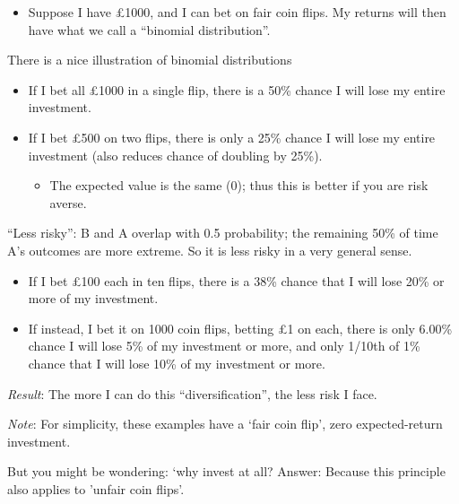 \documentclass[]{article}
\providecommand{\tightlist}{%
  \setlength{\itemsep}{0pt}\setlength{\parskip}{0pt}}
\begin{document}
\begin{itemize}
\tightlist
\item
  Suppose I have \pounds 1000, and I can bet on fair coin flips. My returns will then have what we call a ``binomial distribution''.
\end{itemize}

There is a nice illustration of binomial distributions

\begin{itemize}
\tightlist
\item
  If I bet all \pounds 1000 in a single flip, there is a 50\% chance I will lose my entire investment.
\item
  If I bet \pounds 500 on two flips, there is only a 25\% chance I will lose my entire investment (also reduces chance of doubling by 25\%).

  \begin{itemize}
  \tightlist
  \item
    The expected value is the same (0); thus this is better if you are risk averse.
  \end{itemize}
\end{itemize}

``Less risky'': B and A overlap with 0.5 probability; the remaining 50\% of time A's outcomes are more extreme. So it is less risky in a very general sense.

\begin{itemize}
\tightlist
\item
  If I bet \pounds 100 each in ten flips, there is a 38\% chance that I will lose 20\% or more of my investment.
\item
  If instead, I bet it on 1000 coin flips, betting \pounds 1 on each, there is only 6.00\% chance I will lose 5\% of my investment or more, and only 1/10th of 1\% chance that I will lose 10\% of my investment or more.
\end{itemize}

\bigskip

\emph{Result}: The more I can do this ``diversification'', the less risk I face.

\bigskip

\emph{Note}: For simplicity, these examples have a `fair coin flip', zero expected-return investment.

\bigskip

But you might be wondering: `why invest at all?
Answer: Because this principle also applies to 'unfair coin flips'.

\bigskip
\end{document}
